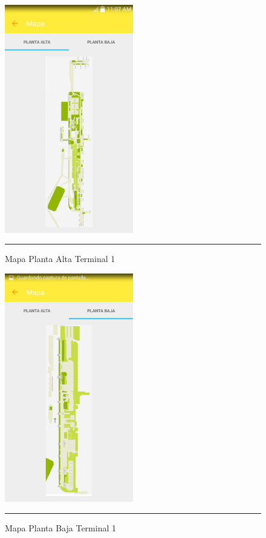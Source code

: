 \begin{figure}[h]
	\centering
		\includegraphics[width=0.5\textwidth]{Figuras/mapapa.png}
		\rule{30em}{0.5pt}
	\caption[Mapa Planta Alta Terminal 1]{Mapa Planta Alta Terminal 1}
	\label{fig:mapaPA}
\end{figure}

\begin{figure}[h]
	\centering
		\includegraphics[width=0.5\textwidth]{Figuras/mapapb.png}
		\rule{30em}{0.5pt}
	\caption[Mapa Planta Baja Terminal 1]{Mapa Planta Baja Terminal 1}
	\label{fig:mapaPB}
\end{figure}
\clearpage

